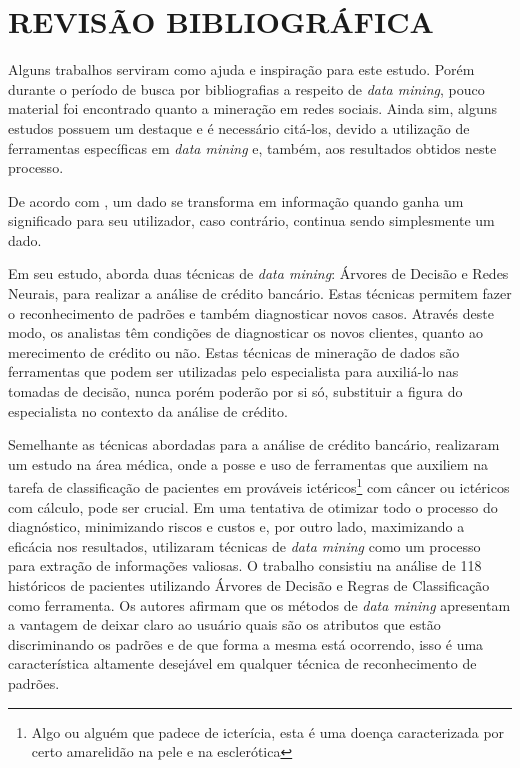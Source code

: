 \chapter{REVISÃO BIBLIOGRÁFICA}\label{ch:rev-bibs}

Alguns trabalhos serviram como ajuda e inspiração para este estudo. Porém durante o período de busca por bibliografias a respeito de \textit{data mining}, pouco material foi encontrado quanto a mineração em redes sociais. Ainda sim, alguns estudos possuem um destaque e é necessário citá-los, devido a utilização de ferramentas específicas em \textit{data mining} e, também, aos resultados obtidos neste processo.

De acordo com , um dado se transforma em informação quando ganha um significado para seu utilizador, caso contrário, continua sendo simplesmente um dado.

Em seu estudo,  aborda duas técnicas de \textit{data mining}: Árvores de Decisão e Redes Neurais, para realizar a análise de crédito bancário. Estas técnicas permitem fazer o reconhecimento de padrões e também diagnosticar novos casos. Através deste modo, os analistas têm condições de diagnosticar os novos clientes, quanto ao merecimento de crédito ou não. Estas técnicas de mineração de dados são ferramentas que podem ser utilizadas pelo especialista para auxiliá-lo nas tomadas de decisão, nunca porém poderão por si só, substituir a figura do especialista no contexto da análise de crédito.

Semelhante as técnicas abordadas para a análise de crédito bancário,  realizaram um estudo na área médica, onde a posse e uso de ferramentas que auxiliem na tarefa de classificação de pacientes em prováveis ictéricos\footnote{Algo ou alguém que padece de icterícia, esta é uma doença caracterizada por certo amarelidão na pele e na esclerótica} com câncer ou ictéricos com cálculo, pode ser crucial. Em uma tentativa de otimizar todo o processo do diagnóstico, minimizando riscos e custos e, por outro lado, maximizando a eficácia nos resultados, utilizaram técnicas de  \textit{data mining} como um processo para extração de informações valiosas. O trabalho consistiu na análise de 118 históricos de pacientes utilizando Árvores de Decisão e Regras de Classificação como ferramenta. Os autores afirmam que os métodos de \textit{data mining} apresentam a vantagem de deixar claro ao usuário quais são os atributos que estão discriminando os padrões e de que forma a mesma está ocorrendo, isso é uma característica altamente desejável em qualquer técnica de reconhecimento de padrões.

